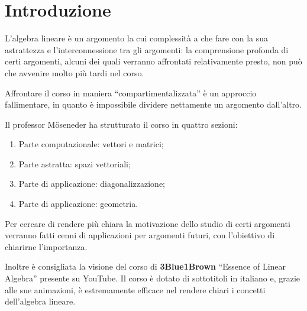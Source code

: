 \chapter*{Introduzione}
L'algebra lineare è un argomento la cui complessità a che fare con la sua astrattezza e l'interconnessione tra gli argomenti: la comprensione profonda di certi argomenti, alcuni dei quali verranno affrontati relativamente presto, non può che avvenire molto più tardi nel corso.

Affrontare il corso in maniera ``compartimentalizzata'' è un approccio fallimentare, in quanto è impossibile dividere nettamente un argomento dall'altro.

Il professor Möseneder ha strutturato il corso in quattro sezioni:
\begin{enumerate}
    \item Parte computazionale: vettori e matrici;
    \item Parte astratta: spazi vettoriali;
    \item Parte di applicazione: diagonalizzazione;
    \item Parte di applicazione: geometria.
\end{enumerate}

Per cercare di rendere più chiara la motivazione dello studio di certi argomenti verranno fatti cenni di applicazioni per argomenti futuri, con l'obiettivo di chiarirne l'importanza.

Inoltre è consigliata la visione del corso di \textbf{3Blue1Brown} ``Essence of Linear Algebra'' presente su YouTube. Il corso è dotato di sottotitoli in italiano e, grazie alle sue animazioni, è estremamente efficace nel rendere chiari i concetti dell'algebra lineare.